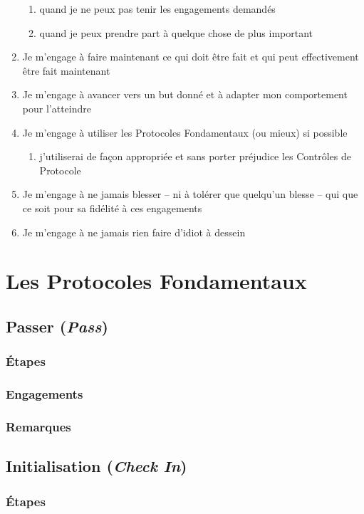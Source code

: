 \documentclass{book}
\begin{document}
\begin{enumerate}
\begin{enumerate}
		\item quand je ne peux pas tenir les engagements demandés
		\item quand je peux prendre part à quelque chose de plus important
	\end{enumerate}
	\item Je m'engage à faire maintenant ce qui doit être fait et qui peut effectivement être fait maintenant
	\item Je m'engage à avancer vers un but donné et à adapter mon comportement pour l'atteindre
	\item Je m'engage à utiliser les Protocoles Fondamentaux (ou mieux) si possible
	\begin{enumerate}
		\item j'utiliserai de façon appropriée et sans porter préjudice les Contrôles de Protocole
	\end{enumerate}
	\item Je m'engage à ne jamais blesser -- ni à tolérer que quelqu'un blesse -- qui que ce soit pour sa fidélité à ces engagements
	\item Je m'engage à ne jamais rien faire d'idiot à dessein
\end{enumerate}

\chapter{Les Protocoles Fondamentaux} \label{core-protocols}

\section{Passer (\emph{Pass})}
\subsection{Étapes}
\subsection{Engagements}
\subsection{Remarques}

\section{Initialisation (\emph{Check In})}
\subsection{Étapes}
\end{document}
